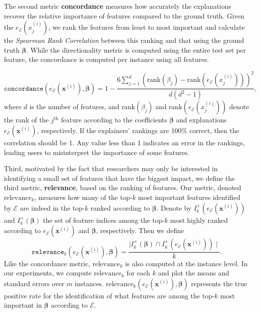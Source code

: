 \documentclass[mnsc,blindrev]{informs3}
\newcommand{\mE}{\mathcal{E}}
\begin{document}
    The second metric \textbf{concordance} measures how accurately the explanations recover the relative importance of features compared to the ground truth. Given the $e_\mathcal{E}(x^{(i)}_j)$, we rank the features from least to most important and calculate the \emph{Spearman Rank Correlation} \cite{spearman1904proof} between this ranking and that using the ground truth $\boldsymbol{\beta}$. While the directionality metric is computed using the entire test set per feature, the concordance is computed per instance using all features.

    \begin{equation}
       \texttt{concordance}(e_\mE(\mathbf{x}^{(i)}),\boldsymbol{\beta}) = 1 - \frac{6\sum_{j=1}^d (\text{rank}(\beta_j) - \text{rank}(e_\mE(x^{(i)}_j)))^2}{d(d^2-1)},
    \end{equation}
    where $d$ is the number of features, and $\text{rank}(\beta_j)$ and $\text{rank}(e_\mE(x^{(i)}_j))$ denote the rank of the $j^{\text{th}}$ feature according to the coefficients $\boldsymbol{\beta}$ and explanations $e_\mE(\mathbf{x}^{(i)})$, respectively. If the explainers' rankings are 100\% correct, then the correlation should be 1. Any value less than 1 indicates an error in the rankings, leading users to misinterpret the importance of some features.
    
Third, motivated by the fact that  researchers may only be  interested in identifying a small set of features that have the biggest impact, we define the third metric, \textbf{relevance}, based on the ranking of features. Our metric, denoted $\text{relevance}_k$, measures how many of the top-$k$ most important features identified by $\mathcal{E}$ are indeed in the top-$k$ ranked according to $\boldsymbol{\beta}$. Denote by $I_k^+(e_\mE(\mathbf{x}^{(i)}))$ and $I_k^+(\boldsymbol{\beta})$  the set of feature indices  among the top-$k$ most highly ranked according to $e_\mE(\mathbf{x}^{(i)})$ and $\boldsymbol{\beta}$, respectively. Then we define 
    \begin{equation}
        \texttt{relevance}_k(e_\mE(\mathbf{x}^{(i)}), \boldsymbol{\beta}) = \frac{\mid I_k^+(\boldsymbol{\beta}) \cap I_k^+(e_\mE(\mathbf{x}^{(i)}))\mid}{k}.
    \end{equation}
     Like the concordance metric, $\text{relevance}_k$ is also computed at the instance level. 
    In our experiments, we compute $\text{relevance}_k$ for each $k$ and plot the means and standard errors over $m$ instances. $\text{relevance}_k(e_\mE(\mathbf{x}^{(i)}), \boldsymbol{\beta})$ represents the true positive rate for the identification of what features are among the top-$k$ most important in $\boldsymbol{\beta}$ according to  $\mathcal{E}$.       
    
\end{document}
